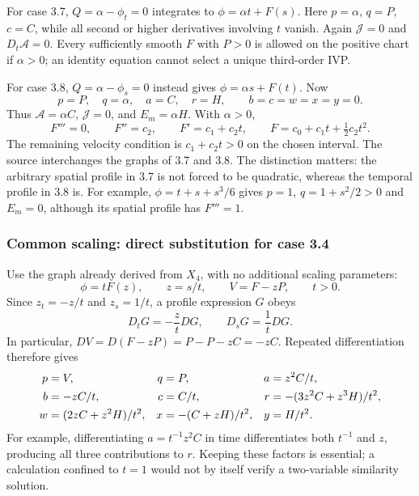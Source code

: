 For case 3.7, $Q=\alpha-\phi_t=0$ integrates to
$\phi=\alpha t+F(s)$. Here $p=\alpha$, $q=P$, $c=C$, while
all second or higher derivatives involving $t$ vanish. Again
$\mathcal J=0$ and $D_t\mathcal A=0$. Every sufficiently smooth $F$
with $P>0$ is allowed on the positive chart if $\alpha>0$; an
identity equation cannot select a unique third-order IVP.

For case 3.8, $Q=\alpha-\phi_s=0$ instead gives
$\phi=\alpha s+F(t)$. Now
\[
 p=P,\quad q=\alpha,\quad a=C,\quad r=H,
 \qquad b=c=w=x=y=0.
\]
Thus $\mathcal A=\alpha C$, $\mathcal J=0$, and
$E_m=\alpha H$. With $\alpha>0$,
\begin{equation}
 F'''=0,\qquad F''=c_2,\qquad F'=c_1+c_2t,\qquad
 F=c_0+c_1t+\tfrac12c_2t^2.
 \label{eq:sve-quadratic-reduction}
\end{equation}
The remaining velocity condition is $c_1+c_2t>0$ on the chosen interval.
The source interchanges the graphs of 3.7 and 3.8. The distinction matters:
the arbitrary spatial profile in 3.7 is not forced to be quadratic, whereas
the temporal profile in 3.8 is. For example,
$\phi=t+s+s^3/6$ gives $p=1$, $q=1+s^2/2>0$ and $E_m=0$, although
its spatial profile has $F'''=1$.

\subsubsection{Common scaling: direct substitution for case 3.4}
Use the graph already derived from $X_4$, with no additional scaling
parameters:
\begin{equation}
 \phi=tF(z),\qquad z=s/t,\qquad V=F-zP,\qquad t>0.
 \label{eq:sve-repro-scale}
\end{equation}
Since $z_t=-z/t$ and $z_s=1/t$, a profile expression $G$ obeys
\begin{equation}
 D_tG=-\frac zt DG,\qquad D_sG=\frac1t DG.
 \label{eq:sve-scaling-chain}
\end{equation}
In particular, $DV=D(F-zP)=P-P-zC=-zC$. Repeated differentiation
therefore gives
\begin{align}
 p&=V,&q&=P,&a&=z^2C/t,\notag\\
 b&=-zC/t,&c&=C/t,&r&=-(3z^2C+z^3H)/t^2,\notag\\
 w&=(2zC+z^2H)/t^2,&x&=-(C+zH)/t^2,&y&=H/t^2.
 \label{eq:sve-scaling-jets}
\end{align}
For example, differentiating $a=t^{-1}z^2C$ in time differentiates
both $t^{-1}$ and $z$, producing all three contributions to $r$.
Keeping these factors is essential; a calculation confined to $t=1$
would not by itself verify a two-variable similarity solution.

